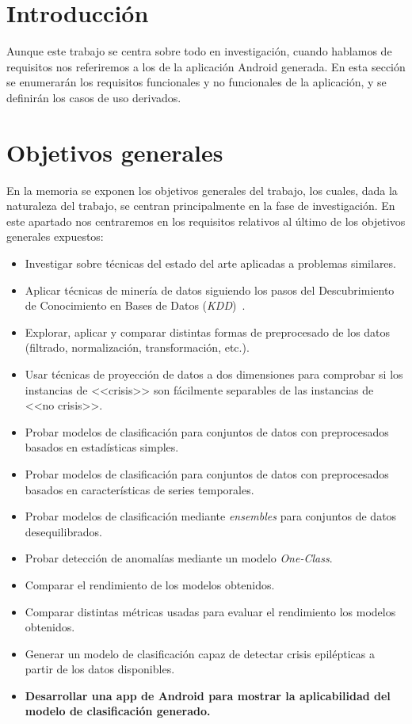 
\section{Introducción}

Aunque este trabajo se centra sobre todo en investigación, cuando hablamos de requisitos nos referiremos a los de la aplicación Android generada. En esta sección se enumerarán los requisitos funcionales y no funcionales de la aplicación, y se definirán los casos de uso derivados.  

\section{Objetivos generales}

En la memoria se exponen los objetivos generales del trabajo, los cuales, dada la naturaleza del trabajo, se centran principalmente en la fase de investigación. En este apartado nos centraremos en los requisitos relativos al último de los objetivos generales expuestos: 

\begin{itemize}
	\item Investigar sobre técnicas del estado del arte aplicadas a problemas similares. 
	\item Aplicar técnicas de minería de datos siguiendo los pasos del Descubrimiento de Conocimiento en Bases de Datos (\textit{KDD})~\cite{fayyad1996data}.
	\item Explorar, aplicar y comparar distintas formas de preprocesado de los datos (filtrado, normalización, transformación, etc.). 
	\item Usar técnicas de proyección de datos a dos dimensiones para comprobar si los instancias de <<crisis>> son fácilmente separables de las instancias de <<no crisis>>. 
	\item Probar modelos de clasificación para conjuntos de datos con preprocesados basados en estadísticas simples.
	\item Probar modelos de clasificación para conjuntos de datos con preprocesados basados en características de series temporales.  
	\item Probar modelos de clasificación mediante \textit{ensembles} para conjuntos de datos desequilibrados. 
	\item Probar detección de anomalías mediante un modelo \textit{One-Class}.
	\item Comparar el rendimiento de los modelos obtenidos. 
	\item Comparar distintas métricas usadas para evaluar el rendimiento los modelos obtenidos. 
	\item Generar un modelo de clasificación capaz de detectar crisis epilépticas a partir de los datos disponibles. 
	\item \textbf{Desarrollar una app de Android para mostrar la aplicabilidad del modelo de clasificación generado.} 
\end{itemize}

